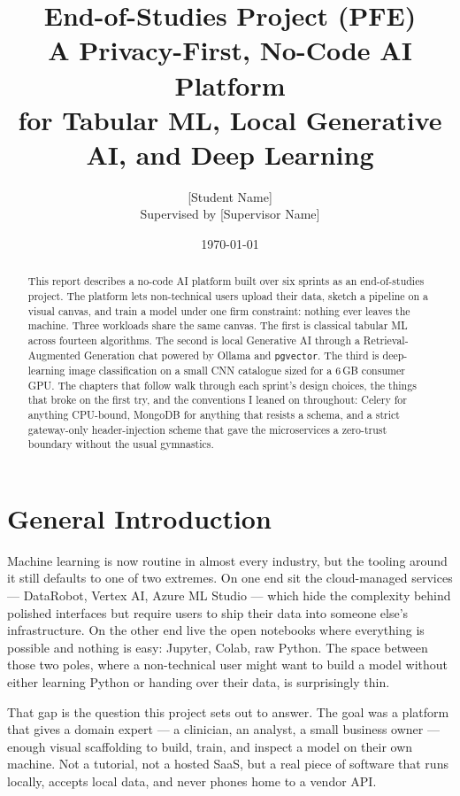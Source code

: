 \documentclass[12pt, a4paper]{report}
\title{End-of-Studies Project (PFE)\\[6pt] \Large A Privacy-First, No-Code AI Platform\\ \large for Tabular ML, Local Generative AI, and Deep Learning}
\author{[Student Name]\\ \small Supervised by [Supervisor Name]}
\date{\today}
\begin{document}
\maketitle

\begin{abstract}
This report describes a no-code AI platform built over six sprints as an
end-of-studies project. The platform lets non-technical users upload their
data, sketch a pipeline on a visual canvas, and train a model under one
firm constraint: nothing ever leaves the machine. Three workloads share
the same canvas. The first is classical tabular ML across fourteen
algorithms. The second is local Generative AI through a
Retrieval-Augmented Generation chat powered by Ollama and
\texttt{pgvector}. The third is deep-learning image classification on a
small CNN catalogue sized for a 6\,GB consumer GPU. The chapters that
follow walk through each sprint's design choices, the things that broke
on the first try, and the conventions I leaned on throughout: Celery for
anything CPU-bound, MongoDB for anything that resists a schema, and a
strict gateway-only header-injection scheme that gave the microservices
a zero-trust boundary without the usual gymnastics.
\end{abstract}

\tableofcontents
\newpage

\listoffigures
\newpage

\chapter*{General Introduction}

Machine learning is now routine in almost every industry, but the
tooling around it still defaults to one of two extremes. On one end sit
the cloud-managed services --- DataRobot, Vertex AI, Azure ML Studio ---
which hide the complexity behind polished interfaces but require users
to ship their data into someone else's infrastructure. On the other end
live the open notebooks where everything is possible and nothing is
easy: Jupyter, Colab, raw Python. The space between those two poles,
where a non-technical user might want to build a model without either
learning Python or handing over their data, is surprisingly thin.

That gap is the question this project sets out to answer. The goal was
a platform that gives a domain expert --- a clinician, an analyst, a
small business owner --- enough visual scaffolding to build, train, and
inspect a model on their own machine. Not a tutorial, not a hosted
SaaS, but a real piece of software that runs locally, accepts local
data, and never phones home to a vendor API.
\end{document}
